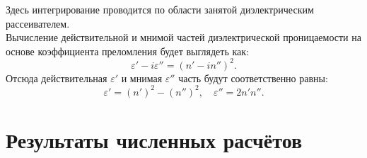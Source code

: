 Здесь интегрирование проводится по области занятой диэлектрическим рассеивателем.\\
Вычисление действительной и мнимой частей диэлектрической проницаемости на основе коэффициента преломления будет выглядеть как:
\begin{equation}
\varepsilon' - i \varepsilon'' = (n'-i n'')^2.
\end{equation}
Отсюда действительная $ \varepsilon' $ и мнимая $ \varepsilon'' $ часть будут соответственно равны:
\begin{equation}
\varepsilon' = (n')^2 - (n'')^2,\quad \varepsilon'' = 2 n'n''.
\end{equation}

\section{Результаты численных расчётов}


%

